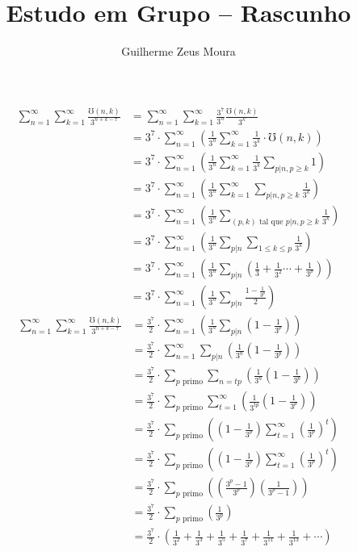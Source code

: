 \documentclass[10pt, a4paper]{article}
\title{Estudo em Grupo -- Rascunho}
\author{Guilherme Zeus Moura}
\begin{document}
	
	\zeustitle


	\begin{align*}
		\sum_{n=1}^\infty \sum_{k=1}^\infty \frac{\mho(n, k)}{3^{n+k-7}}
		&=\sum_{n=1}^\infty \sum_{k=1}^\infty \frac{3^7}{3^n}\frac{\mho(n, k)}{3^k} \\
		&= 3^7 \cdot \sum_{n=1}^\infty \left( \frac{1}{3^n} \sum_{k=1}^\infty \frac{1}{3^k}\cdot\mho(n, k) \right) \\
		&= 3^7 \cdot \sum_{n=1}^\infty \left( \frac{1}{3^n} \sum_{k=1}^\infty \frac{1}{3^k} \sum_{p | n, p \ge k} 1 \right) \\
		&= 3^7 \cdot \sum_{n=1}^\infty \left( \frac{1}{3^n} \sum_{k=1}^\infty \sum_{p | n, p \ge k}  \frac{1}{3^k} \right) \\
		&= 3^7 \cdot \sum_{n=1}^\infty \left( \frac{1}{3^n}  \sum_{(p, k)\text{ tal que }p | n, p \ge k} \frac{1}{3^k} \right) \\
		&= 3^7 \cdot \sum_{n=1}^\infty \left( \frac{1}{3^n}  \sum_{p | n} \sum_{1 \le k\le p} \frac{1}{3^k} \right) \\
		&= 3^7 \cdot \sum_{n=1}^\infty \left( \frac{1}{3^n}  \sum_{p | n} \left( \frac{1}{3} + \frac{1}{3^2} \cdots + \frac{1}{3^p} \right)\right) \\
		&= 3^7 \cdot \sum_{n=1}^\infty \left( \frac{1}{3^n}  \sum_{p | n} \frac{1 - \frac{1}{3^p}}{2}\right)
	\end{align*}
	\begin{align*}
		\sum_{n=1}^\infty \sum_{k=1}^\infty \frac{\mho(n, k)}{3^{n+k-7}}
		&= \frac{3^7}{2} \cdot \sum_{n=1}^\infty \left( \frac{1}{3^n}  \sum_{p | n} \left(1 - \frac{1}{3^p}\right) \right) \\
		&= \frac{3^7}{2} \cdot \sum_{n=1}^\infty \sum_{p|n} \left( \frac{1}{3^n}  \left(1 - \frac{1}{3^p}\right) \right) \\
		&= \frac{3^7}{2} \cdot \sum_{p\text{ primo}} \sum_{n = tp} \left( \frac{1}{3^n}  \left(1 - \frac{1}{3^p}\right) \right) \\	
		&= \frac{3^7}{2} \cdot \sum_{p\text{ primo}} \sum_{t = 1}^\infty \left( \frac{1}{3^{tp}}  \left(1 - \frac{1}{3^p}\right) \right) \\	
		&= \frac{3^7}{2} \cdot \sum_{p\text{ primo}} \left( \left( 1 - \frac{1}{3^p} \right) \sum_{t = 1}^\infty \left(\frac{1}{3^{p}}\right)^t \right) \\	
		&= \frac{3^7}{2} \cdot \sum_{p\text{ primo}} \left( \left( 1 - \frac{1}{3^p} \right) \sum_{t = 1}^\infty \left(\frac{1}{3^{p}}\right)^t \right) \\	
		&= \frac{3^7}{2} \cdot \sum_{p\text{ primo}} \left( \left( \frac{3^p - 1}{3^p} \right) \left(\frac{1}{3^{p} - 1}\right) \right) \\	
		&= \frac{3^7}{2} \cdot \sum_{p\text{ primo}} \left( \frac{1}{3^p} \right) \\	
		&= \frac{3^7}{2} \cdot \left( \frac{1}{3^2} + \frac{1}{3^3} + \frac{1}{3^5} + \frac{1}{3^7} + \frac{1}{3^{11}} + \frac{1}{3^{13}} + \cdots \right) \\
	\end{align*}
\end{document}
